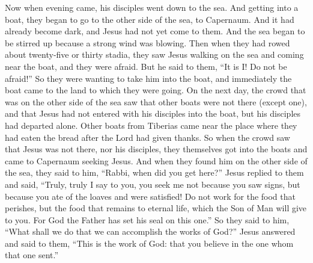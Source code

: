 \begin{biblechapter}
 Now when evening came, his disciples went down to the sea.
\verse And getting into a boat, they began to go to the other side of the sea, to Capernaum. And it had already become dark, and Jesus had not yet come to them.
\verse And the sea began to be stirred up because a strong wind was blowing.
\verse Then when they had rowed about twenty-five or thirty stadia, they saw Jesus walking on the sea and coming near the boat, and they were afraid.
\verse But he said to them, “It is I! Do not be afraid!”
\verse So they were wanting to take him into the boat, and immediately the boat came to the land to which they were going.
 On the next day, the crowd that was on the other side of the sea saw that other boats were not there (except one), and that Jesus had not entered with his disciples into the boat, but his disciples had departed alone.
\verse Other boats from Tiberias came near the place where they had eaten the bread after the Lord had given thanks.
\verse So when the crowd saw that Jesus was not there, nor his disciples, they themselves got into the boats and came to Capernaum seeking Jesus.
\verse And when they found him on the other side of the sea, they said to him, “Rabbi, when did you get here?”
\verse Jesus replied to them and said, “Truly, truly I say to you, you seek me not because you saw signs, but because you ate of the loaves and were satisfied!
\verse Do not work for the food that perishes, but the food that remains to eternal life, which the Son of Man will give to you. For God the Father has set his seal on this one.”
\verse So they said to him, “What shall we do that we can accomplish the works of God?”
\verse Jesus answered and said to them, “This is the work of God: that you believe in the one whom that one sent.”

\end{biblechapter}
